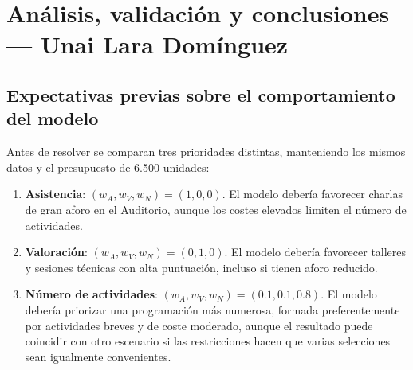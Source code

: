 \section{Análisis, validación y conclusiones --- Unai Lara Domínguez}

\subsection{Expectativas previas sobre el comportamiento del modelo}

Antes de resolver se comparan tres prioridades distintas, manteniendo los
mismos datos y el presupuesto de 6.500 unidades:
\begin{enumerate}
\item \textbf{Asistencia}: $(w_A,w_V,w_N)=(1,0,0)$. El modelo debería favorecer
  charlas de gran aforo en el Auditorio, aunque los costes elevados limiten el
  número de actividades.
\item \textbf{Valoración}: $(w_A,w_V,w_N)=(0,1,0)$. El modelo debería favorecer
  talleres y sesiones técnicas con alta puntuación, incluso si tienen aforo
  reducido.
\item \textbf{Número de actividades}: $(w_A,w_V,w_N)=(0.1,0.1,0.8)$. El modelo
  debería priorizar una programación más numerosa, formada preferentemente por
  actividades breves y de coste moderado, aunque el resultado puede coincidir
  con otro escenario si las restricciones hacen que varias selecciones sean
  igualmente convenientes.
\end{enumerate}

\begin{table}[htbp]
\centering
\caption{Indicadores obtenidos en cada escenario con $B=6500$.}
\label{tab:comparativa_escenarios}
\renewcommand{\arraystretch}{1.25}
\end{table}

